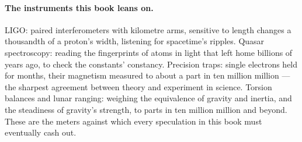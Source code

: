 \documentclass[fontsize=11pt,paper=a4,pagesize=auto,parskip=half-]{scrbook}
\begin{document}
\paragraph{The instruments this book leans on.} LIGO: paired interferometers with kilometre arms, sensitive to length changes a thousandth of a proton's width, listening for spacetime's ripples. Quasar spectroscopy: reading the fingerprints of atoms in light that left home billions of years ago, to check the constants' constancy. Precision traps: single electrons held for months, their magnetism measured to about a part in ten million million --- the sharpest agreement between theory and experiment in science. Torsion balances and lunar ranging: weighing the equivalence of gravity and inertia, and the steadiness of gravity's strength, to parts in ten million million and beyond. These are the meters against which every speculation in this book must eventually cash out.

\backmatter
\printbibliography[title={References}, heading=bibintoc]
\printindex   %
\end{document}
